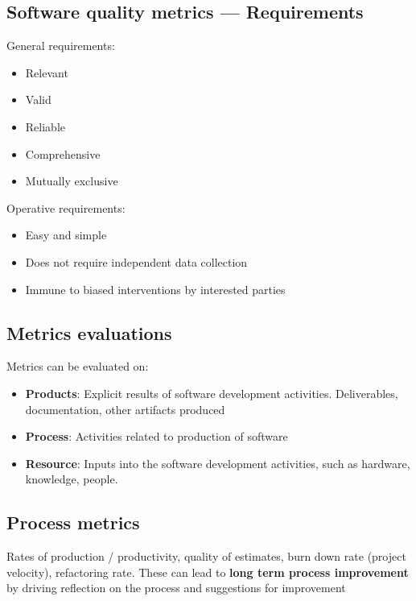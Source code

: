 \documentclass{article}
\begin{document}
\subsection{Software quality metrics — Requirements}

\begin{flushleft}
General	requirements:
\begin{itemize}
  \item Relevant
  \item Valid
  \item Reliable
  \item Comprehensive 
  \item Mutually exclusive
\end{itemize}
Operative requirements:
\begin{itemize}
  \item Easy and simple 
  \item Does not require independent data collection 
  \item Immune to biased interventions by interested parties
\end{itemize}
\end{flushleft}

\subsection{Metrics evaluations}

\begin{flushleft}
Metrics can be evaluated on:
\begin{itemize}
  \item \textbf{Products}: Explicit results of software development activities. Deliverables, documentation, other artifacts produced
  \item \textbf{Process}: Activities	related	to	production	of	software
  \item \textbf{Resource}: Inputs into the software development activities, such as hardware, knowledge, people.
\end{itemize}
\end{flushleft}

\subsection{Process metrics}

\begin{flushleft}
Rates of production / productivity, quality of estimates, burn down rate (project velocity), refactoring rate. These can lead to \textbf{long term process improvement} by driving reflection on the process and suggestions for improvement
\end{flushleft}
\end{document}
